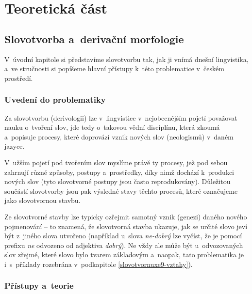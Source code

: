 \part{Teoretická část}

\hypertarget{slovotvorba-a-derivaux10dnuxed-morfologie}{%
\chapter{Slovotvorba a~derivační
morfologie}\label{slovotvorba-a-derivaux10dnuxed-morfologie}}

V~úvodní kapitole si představíme slovotvorbu tak, jak ji vnímá dnešní
lingvistika, a~ve stručnosti si popíšeme hlavní přístupy k~této
problematice v~českém prostředí.

\hypertarget{uvedenuxed-do-problematiky}{%
\section{Uvedení do problematiky}\label{uvedenuxed-do-problematiky}}

Za slovotvorbu (derivologii) lze v~lingvistice v~nejobecnějším pojetí
považovat nauku o~tvoření slov, jde tedy o~takovou vědní disciplínu,
která zkoumá a~popisuje procesy, které doprovází vznik nových slov
(neologismů) v~daném jazyce.

V~užším pojetí pod tvořením slov myslíme právě ty procesy, jež pod sebou
zahrnují různé způsoby, postupy a~prostředky, díky nimž dochází
k~produkci nových slov (tyto slovotvorné postupy jsou často
reprodukovány). Důležitou součástí slovotvorby jsou pak výsledné stavy
těchto procesů, které označujeme jako slovotvornou stavbu.
\parencite[92]{dokulil00}

Ze slovotvorné stavby lze typicky ozřejmit samotný vznik (genezi) daného
nového pojmenování -- to znamená, že slovotvorná stavba ukazuje, jak se
určité slovo jeví být z~jiného slova utvořeno (například u~slova
\emph{ne-dobrý} lze vyčíst, že je pomocí prefixu \emph{ne} odvozeno od
adjektiva \emph{dobrý}). Ne vždy ale může být u~odvozovaných slov
zřejmé, které slovo bylo tvarem základovým a~naopak, tato problematika
je i~s~příklady rozebrána v~podkapitole \ref{slovotvornuxe9-vztahy}).
\parencite[92--93]{dokulil00}

\hypertarget{pux159uxedstupy-a-teorie}{%
\section{Přístupy a~teorie}\label{pux159uxedstupy-a-teorie}}

